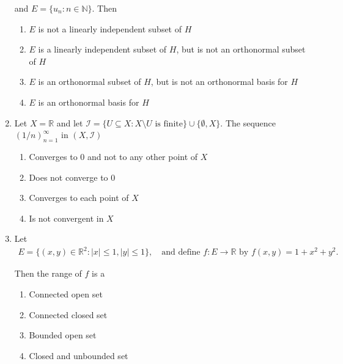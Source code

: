 \documentclass[journal]{IEEEtran}
\numberwithin{equation}{enumi}
\numberwithin{figure}{enumi}
\begin{document}
\begin{enumerate}
and $E = \{u_n : n \in \mathbb{N}\}$. Then
\hfill{}

\begin{enumerate}
    \item $E$ is not a linearly independent subset of $H$
    \item $E$ is a linearly independent subset of $H$, but is not an orthonormal subset of $H$
    \item $E$ is an orthonormal subset of $H$, but is not an orthonormal basis for $H$
    \item $E$ is an orthonormal basis for $H$
\end{enumerate}


\item
Let $X = \mathbb{R}$ and let $\mathcal{I} = \{ U \subseteq X : X \setminus U \text{ is finite}\} \cup \{\emptyset, X\}$. The sequence $(1/n)_{n=1}^\infty$ in $(X, \mathcal{I})$ 
\hfill{}

\begin{enumerate}
    \item Converges to $0$ and not to any other point of $X$
    \item Does not converge to $0$
    \item Converges to each point of $X$
    \item Is not convergent in $X$
\end{enumerate}


\item
Let
\begin{align}
    E = \{(x,y) \in \mathbb{R}^2 : |x| \leq 1, |y| \leq 1 \}, \quad \text{and define } f : E \to \mathbb{R} \text{ by } f(x,y) = 1 + x^2 + y^2.
\end{align}

Then the range of $f$ is a
\hfill{}
\begin{multicols}{2}
\begin{enumerate}
    \item Connected open set
    \item Connected closed set
    \item Bounded open set
    \item Closed and unbounded set
\end{enumerate}
\end{multicols}


\end{enumerate}
\end{document}
